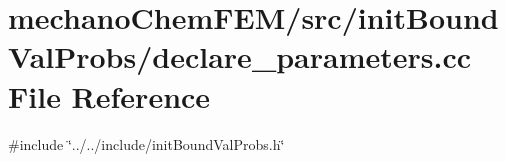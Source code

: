 \section{mechano\+Chem\+F\+E\+M/src/init\+Bound\+Val\+Probs/declare\+\_\+parameters.cc File Reference}
\label{init_bound_val_probs_2declare__parameters_8cc}
{\ttfamily \#include \char`\"{}../../include/init\+Bound\+Val\+Probs.\+h\char`\"{}}\newline
